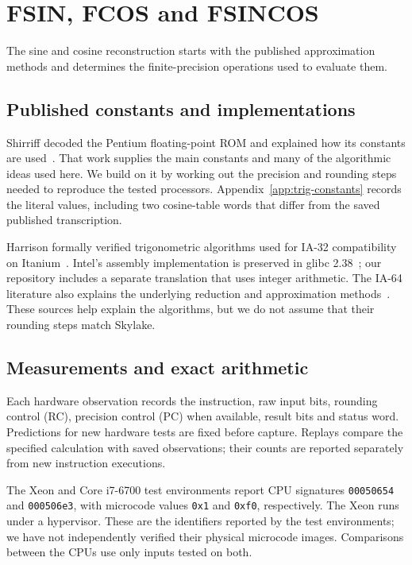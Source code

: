 \documentclass[11pt]{article}
\newcommand{\hex}[1]{\texttt{#1}}
\begin{document}
\section{FSIN, FCOS and FSINCOS}
\label{family:trig}

The sine and cosine reconstruction starts with the published approximation
methods and determines the finite-precision operations used to evaluate them.

\subsection{Published constants and implementations}

Shirriff decoded the Pentium floating-point ROM and explained how its
constants are used~\cite{shirriff2025rom}. That work supplies the main constants
and many of the algorithmic ideas used here. We build on it by working out the
precision and rounding steps needed to reproduce the tested processors.
Appendix~\ref{app:trig-constants} records the literal values, including two
cosine-table words that differ from the saved published transcription.

Harrison formally verified trigonometric algorithms used for IA-32
compatibility on Itanium~\cite{harrison2000}. Intel's assembly implementation
is preserved in glibc 2.38~\cite{glibc238}; our repository includes a separate
translation that uses integer arithmetic. The IA-64 literature also explains
the underlying reduction and approximation methods~\cite{harrison1999}.
These sources help explain the algorithms, but we do not assume that their
rounding steps match Skylake.

\subsection{Measurements and exact arithmetic}

Each hardware observation records the instruction, raw input bits, rounding
control (RC), precision control (PC) when available, result bits and status
word. Predictions for new hardware tests are fixed before capture. Replays
compare the specified calculation with saved observations; their counts are
reported separately from new instruction executions.

The Xeon and Core i7-6700 test environments report CPU signatures \hex{00050654} and
\hex{000506e3}, with microcode values \hex{0x1} and \hex{0xf0}, respectively.
The Xeon runs under a hypervisor. These are the identifiers reported by the
test environments; we have not independently verified their physical microcode
images. Comparisons between the CPUs use only inputs tested on both.
\end{document}
